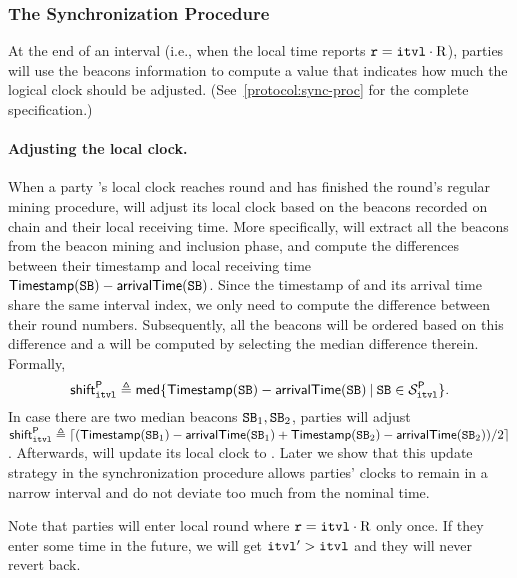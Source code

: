 \subsubsection{The Synchronization Procedure}
\label{subsubsec:sync-procedure}

At the end of an interval (i.e., when the local time reports $\mathtt{r} = \mathtt{itvl} \cdot \mathrm{R}$), parties will use the beacons information to compute a value \shift that indicates how much the logical clock should be adjusted.
%
(See~\cref{protocol:sync-proc} for the complete specification.)

\paragraph{Adjusting the local clock.}
%
When a party \party's local clock reaches round \protocolTime{\interval}{\interval \cdot \syncLen} and \party has finished the round's regular mining procedure, \party will adjust its local clock based on the beacons recorded on chain and their local receiving time.
%
More specifically, \party will extract all the beacons from the beacon mining and inclusion phase, and compute the differences between their timestamp and local receiving time $\mathsf{Timestamp}(\mathtt{SB}) - \mathsf{arrivalTime}(\mathtt{SB})$.
%
Since the timestamp of \beacon and its arrival time share the same interval index, we only need to compute the difference between their round numbers.
%
Subsequently, all the beacons will be ordered based on this difference and a \shift will be computed by selecting the median difference therein.
%
Formally,
%
\begin{equation} \label{eq:sync-shift}
    \mathsf{shift}^{\mathsf{P}}_\mathtt{itvl} \triangleq \mathsf{med} \{ \mathsf{Timestamp}(\mathtt{SB}) - \mathsf{arrivalTime}(\mathtt{SB}) \mathbin| \mathtt{SB} \in \mathcal{S}^\mathsf{P}_\mathtt{itvl} \}.
\end{equation}
%
In case there are two median beacons $\mathtt{SB}_1, \mathtt{SB}_2$, parties will adjust
$\mathsf{shift}^{\mathsf{P}}_\mathtt{itvl} \triangleq \lceil (\mathsf{Timestamp}(\mathtt{SB}_1) - \mathsf{arrivalTime}(\mathtt{SB}_1) + \mathsf{Timestamp}(\mathtt{SB}_2) - \mathsf{arrivalTime}(\mathtt{SB}_2)) / 2 \rceil$.
%
Afterwards, \party will update its local clock to .
%
Later we show that this update strategy in the synchronization procedure allows parties' clocks to remain in a narrow interval and do not deviate too much from the nominal time.

Note that parties will enter local round \protocolTime{\interval}{\round} where $\mathtt{r} = \mathtt{itvl} \cdot \mathrm{R}$ only once.
%
If they enter some time  in the future, we will get $\mathtt{itvl}' > \mathtt{itvl}$ and they will never revert back.

